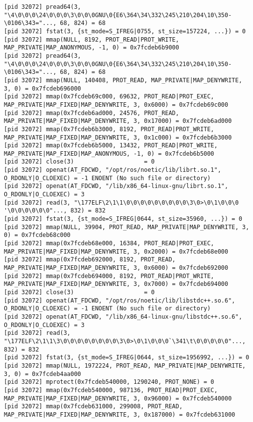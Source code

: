 \documentclass[a4paper, 14pt]{article}
\begin{document}
\begin{lstlisting}
[pid 32072] pread64(3, "\4\0\0\0\24\0\0\0\3\0\0\0GNU\0{E6\364\34\332\245\210\204\10\350-\0106\343="..., 68, 824) = 68
[pid 32072] fstat(3, {st_mode=S_IFREG|0755, st_size=157224, ...}) = 0
[pid 32072] mmap(NULL, 8192, PROT_READ|PROT_WRITE, MAP_PRIVATE|MAP_ANONYMOUS, -1, 0) = 0x7fcdeb6b9000
[pid 32072] pread64(3, "\4\0\0\0\24\0\0\0\3\0\0\0GNU\0{E6\364\34\332\245\210\204\10\350-\0106\343="..., 68, 824) = 68
[pid 32072] mmap(NULL, 140408, PROT_READ, MAP_PRIVATE|MAP_DENYWRITE, 3, 0) = 0x7fcdeb696000
[pid 32072] mmap(0x7fcdeb69c000, 69632, PROT_READ|PROT_EXEC, MAP_PRIVATE|MAP_FIXED|MAP_DENYWRITE, 3, 0x6000) = 0x7fcdeb69c000
[pid 32072] mmap(0x7fcdeb6ad000, 24576, PROT_READ, MAP_PRIVATE|MAP_FIXED|MAP_DENYWRITE, 3, 0x17000) = 0x7fcdeb6ad000
[pid 32072] mmap(0x7fcdeb6b3000, 8192, PROT_READ|PROT_WRITE, MAP_PRIVATE|MAP_FIXED|MAP_DENYWRITE, 3, 0x1c000) = 0x7fcdeb6b3000
[pid 32072] mmap(0x7fcdeb6b5000, 13432, PROT_READ|PROT_WRITE, MAP_PRIVATE|MAP_FIXED|MAP_ANONYMOUS, -1, 0) = 0x7fcdeb6b5000
[pid 32072] close(3)                    = 0
[pid 32072] openat(AT_FDCWD, "/opt/ros/noetic/lib/librt.so.1", O_RDONLY|O_CLOEXEC) = -1 ENOENT (No such file or directory)
[pid 32072] openat(AT_FDCWD, "/lib/x86_64-linux-gnu/librt.so.1", O_RDONLY|O_CLOEXEC) = 3
[pid 32072] read(3, "\177ELF\2\1\1\0\0\0\0\0\0\0\0\0\3\0>\0\1\0\0\0 '\0\0\0\0\0\0"..., 832) = 832
[pid 32072] fstat(3, {st_mode=S_IFREG|0644, st_size=35960, ...}) = 0
[pid 32072] mmap(NULL, 39904, PROT_READ, MAP_PRIVATE|MAP_DENYWRITE, 3, 0) = 0x7fcdeb68c000
[pid 32072] mmap(0x7fcdeb68e000, 16384, PROT_READ|PROT_EXEC, MAP_PRIVATE|MAP_FIXED|MAP_DENYWRITE, 3, 0x2000) = 0x7fcdeb68e000
[pid 32072] mmap(0x7fcdeb692000, 8192, PROT_READ, MAP_PRIVATE|MAP_FIXED|MAP_DENYWRITE, 3, 0x6000) = 0x7fcdeb692000
[pid 32072] mmap(0x7fcdeb694000, 8192, PROT_READ|PROT_WRITE, MAP_PRIVATE|MAP_FIXED|MAP_DENYWRITE, 3, 0x7000) = 0x7fcdeb694000
[pid 32072] close(3)                    = 0
[pid 32072] openat(AT_FDCWD, "/opt/ros/noetic/lib/libstdc++.so.6", O_RDONLY|O_CLOEXEC) = -1 ENOENT (No such file or directory)
[pid 32072] openat(AT_FDCWD, "/lib/x86_64-linux-gnu/libstdc++.so.6", O_RDONLY|O_CLOEXEC) = 3
[pid 32072] read(3, "\177ELF\2\1\1\3\0\0\0\0\0\0\0\0\3\0>\0\1\0\0\0`\341\t\0\0\0\0\0"..., 832) = 832
[pid 32072] fstat(3, {st_mode=S_IFREG|0644, st_size=1956992, ...}) = 0
[pid 32072] mmap(NULL, 1972224, PROT_READ, MAP_PRIVATE|MAP_DENYWRITE, 3, 0) = 0x7fcdeb4aa000
[pid 32072] mprotect(0x7fcdeb540000, 1290240, PROT_NONE) = 0
[pid 32072] mmap(0x7fcdeb540000, 987136, PROT_READ|PROT_EXEC, MAP_PRIVATE|MAP_FIXED|MAP_DENYWRITE, 3, 0x96000) = 0x7fcdeb540000
[pid 32072] mmap(0x7fcdeb631000, 299008, PROT_READ, MAP_PRIVATE|MAP_FIXED|MAP_DENYWRITE, 3, 0x187000) = 0x7fcdeb631000

\end{lstlisting}
\end{document}
